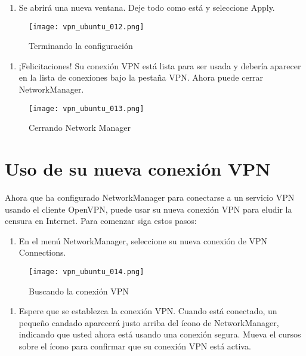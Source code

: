 \documentclass[10pt,a5paper,twoside,,]{book}
\providecommand{\tightlist}{%
  \setlength{\itemsep}{0pt}\setlength{\parskip}{0pt}}
\begin{document}
\begin{enumerate}
\def\labelenumi{\arabic{enumi}.}
\setcounter{enumi}{4}
\tightlist
\item
  Se abrirá una nueva ventana. Deje todo como está y seleccione Apply.
\end{enumerate}

\begin{figure}[htbp]
\centering
\texttt{[image: vpn\_ubuntu\_012.png]}
\caption{Terminando la configuración}
\end{figure}

\begin{enumerate}
\def\labelenumi{\arabic{enumi}.}
\setcounter{enumi}{5}
\tightlist
\item
  ¡Felicitaciones! Su conexión VPN está lista para ser usada y debería
  aparecer en la lista de conexiones bajo la pestaña VPN. Ahora puede
  cerrar NetworkManager.
\end{enumerate}

\begin{figure}[htbp]
\centering
\texttt{[image: vpn\_ubuntu\_013.png]}
\caption{Cerrando Network Manager}
\end{figure}

\section{Uso de su nueva conexión
VPN}\label{uso-de-su-nueva-conexiuxf3n-vpn}

Ahora que ha configurado NetworkManager para conectarse a un servicio
VPN usando el cliente OpenVPN, puede usar su nueva conexión VPN para
eludir la censura en Internet. Para comenzar siga estos pasos:

\begin{enumerate}
\def\labelenumi{\arabic{enumi}.}
\tightlist
\item
  En el menú NetworkManager, seleccione su nueva conexión de VPN
  Connections.
\end{enumerate}

\begin{figure}[htbp]
\centering
\texttt{[image: vpn\_ubuntu\_014.png]}
\caption{Buscando la conexión VPN}
\end{figure}

\begin{enumerate}
\def\labelenumi{\arabic{enumi}.}
\setcounter{enumi}{1}
\tightlist
\item
  Espere que se establezca la conexión VPN. Cuando está conectado, un
  pequeño candado aparecerá justo arriba del ícono de NetworkManager,
  indicando que usted ahora está usando una conexión segura. Mueva el
  cursos sobre el ícono para confirmar que su conexión VPN está activa.
\end{enumerate}
\end{document}
